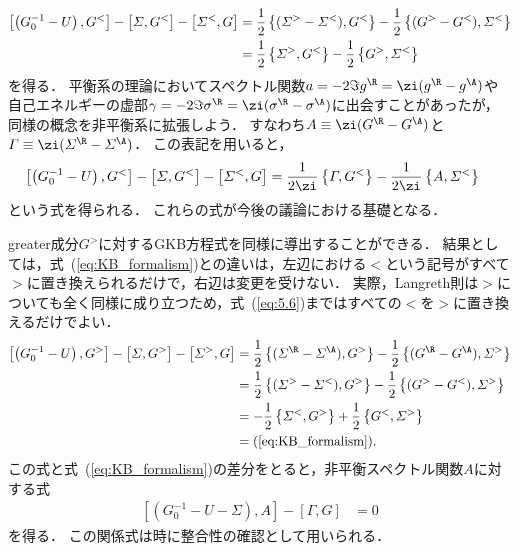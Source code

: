 \documentclass[a4paper,10pt]{jsarticle}
\begin{document}
\begin{align}
\left[ \left( G_0^{-1} - U \right), G^{<} \right]
	- \left[ \varSigma, G^{<} \right]
	- \left[ \varSigma^{<}, G \right]
	& = \frac{1}{2} \left\{ ( \varSigma^{>} - \varSigma^{<} ), G^{<} \right\}
		- \frac{1}{2} \left\{ ( G^{>} - G^{<} ), \varSigma^{<} \right\}
\notag \\
	& = \frac{1}{2} \left\{ \varSigma^{>}, G^{<} \right\}
		- \frac{1}{2} \left\{ G^{>}, \varSigma^{<} \right\}
\label{eq:KB_formalism}
\end{align}
を得る．
平衡系の理論においてスペクトル関数$a = - 2 \Im g^{\R} = \zi ( g^{\R} - g^{\A} )$や自己エネルギーの虚部$\gamma = - 2 \Im \sigma^{\R} = \zi (\sigma^{\R} - \sigma^{\A})$に出会すことがあったが，同様の概念を非平衡系に拡張しよう．
すなわち$A \equiv \zi (G^{\R} - G^{\A})$と$\varGamma \equiv \zi (\varSigma^{\R} - \varSigma^{\A})$．
この表記を用いると，
\begin{align*}
\left[ \left( G_0^{-1} - U \right), G^{<} \right]
	- \left[ \varSigma, G^{<} \right]
	- \left[ \varSigma^{<}, G \right]
	& = \frac{1}{2\zi} \left\{ \varGamma, G^{<} \right\}
		- \frac{1}{2\zi} \left\{ A, \varSigma^{<} \right\}
\end{align*}
という式を得られる．
これらの式が今後の議論における基礎となる．

greater成分$G^{>}$に対するGKB方程式を同様に導出することができる．
結果としては，式~(\ref{eq:KB_formalism})との違いは，左辺における$<$という記号がすべて$>$に置き換えられるだけで，右辺は変更を受けない．
実際，Langreth則は$>$についても全く同様に成り立つため，式~(\ref{eq:5.6})まではすべての$<$を$>$に置き換えるだけでよい．
\begin{align*}
\left[ \left( G_0^{-1} - U \right), G^{>} \right]
	- \left[ \varSigma, G^{>} \right]
	- \left[ \varSigma^{>}, G \right]
	& = \frac{1}{2} \left\{ ( \varSigma^{\R} - \varSigma^{\A} ), G^{>} \right\}
		- \frac{1}{2} \left\{ ( G^{\R} - G^{\A} ), \varSigma^{>} \right\}
\\	& = \frac{1}{2} \left\{ ( \varSigma^{>} - \varSigma^{<} ), G^{>} \right\}
		- \frac{1}{2} \left\{ ( G^{>} - G^{<} ), \varSigma^{>} \right\}
\\	& = - \frac{1}{2} \left\{ \varSigma^{<}, G^{>} \right\}
		+ \frac{1}{2} \left\{ G^{<}, \varSigma^{>} \right\}
\\	& = \text{(\ref{eq:KB_formalism})}	
.\end{align*}
この式と式~(\ref{eq:KB_formalism})の差分をとると，非平衡スペクトル関数$A$に対する式
\begin{align}
\left[ \left( G_0^{-1} - U - \varSigma \right), A \right]
	- \left[ \varGamma, G \right]
	& = 0
\label{eq:5.8}
\end{align}
を得る．
この関係式は時に整合性の確認として用いられる．
\end{document}
